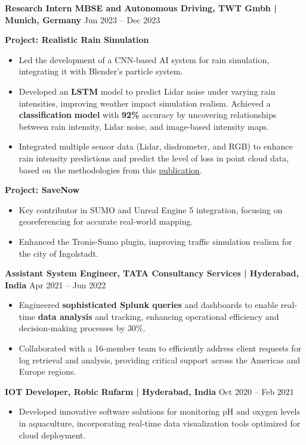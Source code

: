 \documentclass[a4paper,10pt]{article}
\begin{document}
\noindent\textbf{Research Intern MBSE and Autonomous Driving, TWT Gmbh | Munich, Germany} \hfill Jun 2023 – Dec 2023

    \noindent\textbf{Project: Realistic Rain Simulation}
\begin{itemize}
    \item Led the development of a CNN-based AI system for rain simulation, integrating it with Blender’s particle system.
    \item Developed an \textbf{LSTM} model to predict Lidar noise under varying rain intensities, improving weather impact simulation realism. Achieved a \textbf{classification} \textbf{model} with \textbf{92\%} accuracy by uncovering relationships between rain intensity, Lidar noise, and image-based intensity maps.
    \item Integrated multiple sensor data (Lidar, disdrometer, and RGB) to enhance rain intensity predictions and predict the level of loss in point cloud data, based on the methodologies from this  \href{https://ieeexplore.ieee.org/stamp/stamp.jsp?tp=&arnumber=10011628}{publication}.
\end{itemize}
\noindent\textbf {Project: SaveNow}
\begin{itemize}
    \item Key contributor in SUMO and Unreal Engine 5 integration, focusing on georeferencing for accurate real-world mapping.
    \item Enhanced the Tronis-Sumo plugin, improving traffic simulation realism for the city of Ingolstadt.
\end{itemize}

\noindent\textbf{Assistant System Engineer, TATA Consultancy Services | Hyderabad, India} \hfill Apr 2021 – Jun 2022
\begin{itemize}
    \item Engineered \textbf{sophisticated Splunk queries} and dashboards to enable real-time \textbf{data analysis} and tracking, enhancing operational efficiency and decision-making processes by 30\%.
    \item Collaborated with a 16-member team to efficiently address client requests for log retrieval and analysis, providing critical support across the Americas and Europe regions.
\end{itemize}
\noindent\textbf{IOT Developer, Robic Rufarm | Hyderabad, India} \hfill Oct 2020 – Feb 2021
\begin{itemize}
    \item Developed innovative software solutions for monitoring pH and oxygen levels in aquaculture, incorporating real-time data visualization tools optimized for cloud deployment.
\end{itemize}
\end{document}
